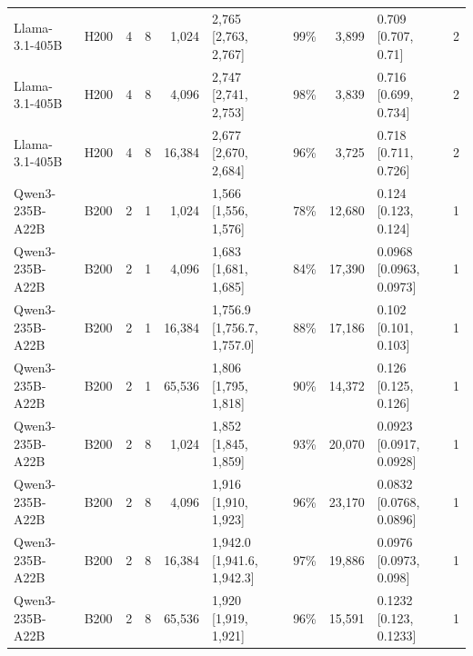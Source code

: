 \begin{landscape}
\begin{longtable}{llrrrlrrlr}
Llama-3.1-405B & H200 & 4 & 8 & 1,024 & 2,765 {[}2,763, 2,767{]} & 99\% & 3,899 & 0.709 {[}0.707, 0.71{]} & 2 \\
Llama-3.1-405B & H200 & 4 & 8 & 4,096 & 2,747 {[}2,741, 2,753{]} & 98\% & 3,839 & 0.716 {[}0.699, 0.734{]} & 2 \\
Llama-3.1-405B & H200 & 4 & 8 & 16,384 & 2,677 {[}2,670, 2,684{]} & 96\% & 3,725 & 0.718 {[}0.711, 0.726{]} & 2 \\
Qwen3-235B-A22B & B200 & 2 & 1 & 1,024 & 1,566 {[}1,556, 1,576{]} & 78\% & 12,680 & 0.124 {[}0.123, 0.124{]} & 1 \\
Qwen3-235B-A22B & B200 & 2 & 1 & 4,096 & 1,683 {[}1,681, 1,685{]} & 84\% & 17,390 & 0.0968 {[}0.0963, 0.0973{]} & 1 \\
Qwen3-235B-A22B & B200 & 2 & 1 & 16,384 & 1,756.9 {[}1,756.7, 1,757.0{]} & 88\% & 17,186 & 0.102 {[}0.101, 0.103{]} & 1 \\
Qwen3-235B-A22B & B200 & 2 & 1 & 65,536 & 1,806 {[}1,795, 1,818{]} & 90\% & 14,372 & 0.126 {[}0.125, 0.126{]} & 1 \\
Qwen3-235B-A22B & B200 & 2 & 8 & 1,024 & 1,852 {[}1,845, 1,859{]} & 93\% & 20,070 & 0.0923 {[}0.0917, 0.0928{]} & 1 \\
Qwen3-235B-A22B & B200 & 2 & 8 & 4,096 & 1,916 {[}1,910, 1,923{]} & 96\% & 23,170 & 0.0832 {[}0.0768, 0.0896{]} & 1 \\
Qwen3-235B-A22B & B200 & 2 & 8 & 16,384 & 1,942.0 {[}1,941.6, 1,942.3{]} & 97\% & 19,886 & 0.0976 {[}0.0973, 0.098{]} & 1 \\
Qwen3-235B-A22B & B200 & 2 & 8 & 65,536 & 1,920 {[}1,919, 1,921{]} & 96\% & 15,591 & 0.1232 {[}0.123, 0.1233{]} & 1 \\
\end{longtable}
\endgroup
\end{landscape}
\restoregeometry
